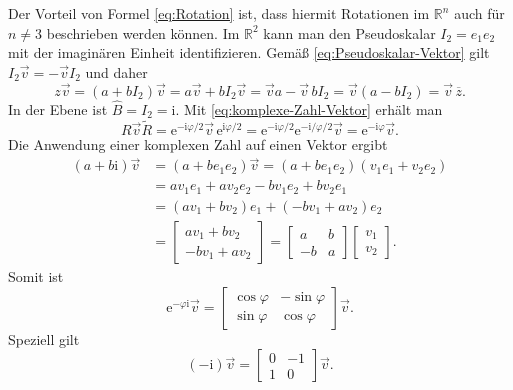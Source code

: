 \documentclass[a4paper,fleqn,11pt]{article}
\theoremstyle{rmbox}
\newcommand{\R}{\mathbb R}
\newcommand{\ui}{\mathrm i}
\newcommand{\ee}{\mathrm e}
\begin{document}

\noindent
Der Vorteil von Formel \eqref{eq:Rotation} ist, dass hiermit
Rotationen im $\R^n$ auch für $n\ne 3$ beschrieben werden können.
Im $\R^2$ kann man den Pseudoskalar $I_2=e_1e_2$ mit der
imaginären Einheit identifizieren. Gemäß \eqref{eq:Pseudoskalar-Vektor}
gilt $I_2\vec v=-\vec vI_2$ und daher
\begin{equation}\label{eq:komplexe-Zahl-Vektor}
z\vec v = (a+bI_2)\vec v = a\vec v+bI_2\vec v
= \vec v a -\vec v\,bI_2 = \vec v(a-bI_2) = \vec v\,\overline z.
\end{equation}
In der Ebene ist $\hat B=I_2=\ui$. Mit \eqref{eq:komplexe-Zahl-Vektor}
erhält man
\begin{equation}
R\vec v\tilde R = \ee^{-\ui\varphi/2}\vec v\,\ee^{\ui\varphi/2}
= \ee^{-\ui\varphi/2}\ee^{-\ui/\varphi/2}\vec v
= \ee^{-\ui\varphi}\vec v.
\end{equation}
Die Anwendung einer komplexen Zahl auf einen Vektor ergibt
\begin{align}
(a+b\ui)\vec v &= (a+be_1e_2)\vec v = (a+be_1e_2)(v_1e_1+v_2e_2)\\
&= av_1 e_1 + av_2 e_2 - bv_1 e_2 + bv_2 e_1\\
&= (av_1+bv_2)e_1+(-bv_1+av_2)e_2\\
&= \begin{bmatrix}
av_1+bv_2\\
-bv_1+av_2
\end{bmatrix}
= \begin{bmatrix}
a & b\\
-b & a
\end{bmatrix}\begin{bmatrix}
v_1\\ v_2
\end{bmatrix}.
\end{align}
Somit ist
\begin{equation}
\ee^{-\varphi\ui}\vec v = \begin{bmatrix}
\cos\varphi & -\sin\varphi\\
\sin\varphi & \cos\varphi
\end{bmatrix}\vec v.
\end{equation}
Speziell gilt
\begin{equation}
(-\ui)\vec v = \begin{bmatrix}
0 & -1\\
1 & 0
\end{bmatrix}\vec v.
\end{equation}
\end{document}
